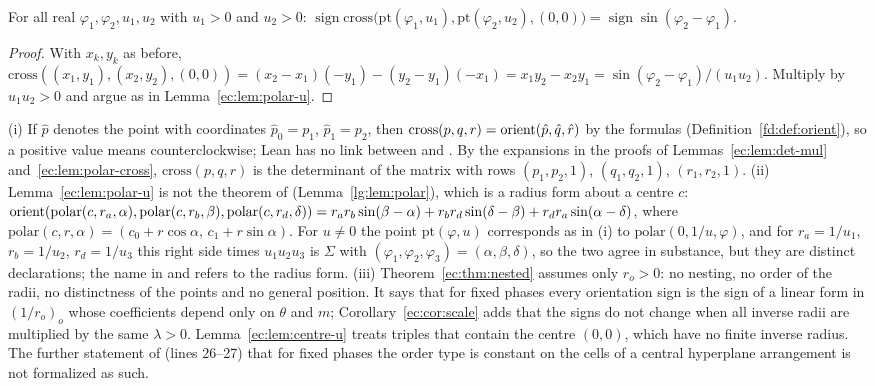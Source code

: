 \begin{lemma}\label{ec:lem:centre-u}
For all real $\varphi_1,\varphi_2,u_1,u_2$ with $u_1>0$ and $u_2>0$:
$\operatorname{sign}\mathrm{cross}\bigl(\mathrm{pt}(\varphi_1,u_1),\mathrm{pt}(\varphi_2,u_2),(0,0)\bigr)=\operatorname{sign}\sin(\varphi_2-\varphi_1)$.
\end{lemma}

\begin{proof}
With $x_k,y_k$ as before, $\mathrm{cross}((x_1,y_1),(x_2,y_2),(0,0))=(x_2-x_1)(-y_1)-(y_2-y_1)(-x_1)=x_1y_2-x_2y_1
=\sin(\varphi_2-\varphi_1)/(u_1u_2)$. Multiply by $u_1u_2>0$ and argue as in Lemma~\ref{ec:lem:polar-u}.
\end{proof}

\begin{remark}\label{ec:rem:polar}
(i) If $\hat p$ denotes the point with coordinates $\hat p_0=p_1$, $\hat p_1=p_2$, then
$\mathrm{cross}(p,q,r)=\operatorname{orient}(\hat p,\hat q,\hat r)$ by the formulas (Definition~\ref{fd:def:orient}), so a positive
value means counterclockwise; Lean has no link between  and . By the
expansions in the proofs of Lemmas~\ref{ec:lem:det-mul} and~\ref{ec:lem:polar-cross}, $\mathrm{cross}(p,q,r)$ is
the determinant of the matrix with rows $(p_1,p_2,1)$, $(q_1,q_2,1)$, $(r_1,r_2,1)$.
(ii) Lemma~\ref{ec:lem:polar-u} is not the theorem  of 
(Lemma~\ref{lg:lem:polar}), which is a radius form about a centre $c$:
$\operatorname{orient}(\mathrm{polar}(c,r_a,\alpha),\mathrm{polar}(c,r_b,\beta),\mathrm{polar}(c,r_d,\delta))=r_ar_b\sin(\beta-\alpha)
+r_br_d\sin(\delta-\beta)+r_dr_a\sin(\alpha-\delta)$, where $\mathrm{polar}(c,r,\alpha)=(c_0+r\cos\alpha,\,c_1+r\sin\alpha)$.
For $u\ne0$ the point $\mathrm{pt}(\varphi,u)$ corresponds as in (i) to $\mathrm{polar}(0,1/u,\varphi)$, and for
$r_a=1/u_1$, $r_b=1/u_2$, $r_d=1/u_3$ this right side times $u_1u_2u_3$ is $\Sigma$ with
$(\varphi_1,\varphi_2,\varphi_3)=(\alpha,\beta,\delta)$, so the two agree in substance,
but they are distinct declarations; the name  in  and
 refers to the radius form.
(iii) Theorem~\ref{ec:thm:nested} assumes only $r_o>0$: no nesting, no order of the radii, no distinctness of the
points and no general position. It says that for fixed phases every orientation sign is the sign of a linear form in
$(1/r_o)_o$ whose coefficients depend only on $\theta$ and $m$; Corollary~\ref{ec:cor:scale} adds that the signs do
not change when all inverse radii are multiplied by the same $\lambda>0$. Lemma~\ref{ec:lem:centre-u} treats triples
that contain the centre $(0,0)$, which have no finite inverse radius. The further statement of
 (lines 26--27) that for fixed phases the order type is constant on the cells of a
central hyperplane arrangement is not formalized as such.
\end{remark}


